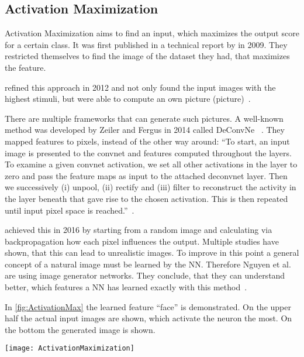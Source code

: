 \subsection{Activation Maximization}
Activation Maximization aims to find an input, which maximizes the output score for a certain class. It was first published in a technical report by  in 2009. They restricted themselves to find the image of the dataset they had, that maximizes the feature.
\par
{} refined this approach in 2012 and not only found the input images with the highest stimuli, but were able to compute an own picture (picture)~\cite{Le.2012}.
\par
There are multiple frameworks that can generate such pictures. A well-known method was developed by Zeiler and Fergus in 2014 called DeConvNe~ \cite{Zeiler.2014}. They mapped features to pixels, instead of the other way around:
“To start, an input image is presented to the convnet and features computed throughout the layers. To examine a given convnet activation, we set all other activations in the layer to zero and pass the feature maps as input to the attached deconvnet layer. Then we successively (i) unpool, (ii) rectify and (iii) filter to reconstruct the activity in the layer beneath that gave rise to the chosen activation. This is then repeated until input pixel space is reached.”~\cite[820]{Zeiler.2014}.
\par
{} achieved this in 2016 by starting from a random image and calculating via backpropagation how each pixel influences the output. Multiple studies have shown, that this can lead to unrealistic images. To improve in this point a general concept of a natural image must be learned by the NN. Therefore Nguyen et al. are using image generator networks. They conclude, that they can understand better, which features a NN has learned exactly with this method~\cite{Nguyen.2016}. 
\par
In \cref{fig:ActivationMax} the learned feature “face” is demonstrated. On the upper half the actual input images are shown, which activate the neuron the most. On the bottom the generated image is shown.
\begin{figure*}[h]
    \center
    \texttt{[image: ActivationMaximization]}
    \caption{Inputs, that activate the “face-neuron” the most.
    Top: actual input images 
    Bottom: via backpropagation found input~\cite{Le.2012}}
    \label{fig:ActivationMax}
\end{figure*}